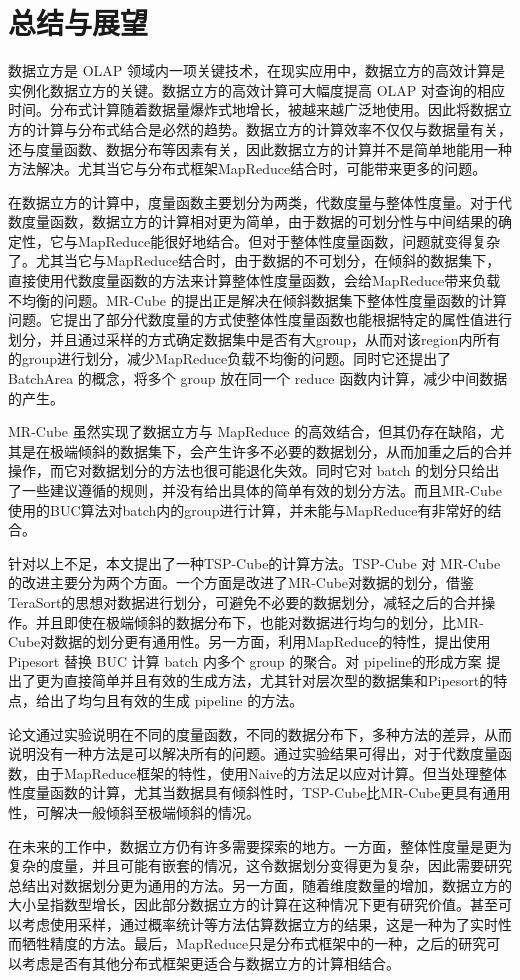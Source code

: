 
\chapter{总结与展望}

数据立方是 OLAP 领域内一项关键技术，在现实应用中，数据立方的高效计算是实例化数据立方的关键。数据立方的高效计算可大幅度提高 OLAP 对查询的相应时间。分布式计算随着数据量爆炸式地增长，被越来越广泛地使用。因此将数据立方的计算与分布式结合是必然的趋势。数据立方的计算效率不仅仅与数据量有关，还与度量函数、数据分布等因素有关，因此数据立方的计算并不是简单地能用一种方法解决。尤其当它与分布式框架MapReduce结合时，可能带来更多的问题。

在数据立方的计算中，度量函数主要划分为两类，代数度量与整体性度量。对于代数度量函数，数据立方的计算相对更为简单，由于数据的可划分性与中间结果的确定性，它与MapReduce能很好地结合。但对于整体性度量函数，问题就变得复杂了。尤其当它与MapReduce结合时，由于数据的不可划分，在倾斜的数据集下，直接使用代数度量函数的方法来计算整体性度量函数，会给MapReduce带来负载不均衡的问题。MR-Cube 的提出正是解决在倾斜数据集下整体性度量函数的计算问题。它提出了部分代数度量的方式使整体性度量函数也能根据特定的属性值进行划分，并且通过采样的方式确定数据集中是否有大group，从而对该region内所有的group进行划分，减少MapReduce负载不均衡的问题。同时它还提出了 BatchArea 的概念，将多个 group 放在同一个 reduce 函数内计算，减少中间数据的产生。

MR-Cube 虽然实现了数据立方与 MapReduce 的高效结合，但其仍存在缺陷，尤其是在极端倾斜的数据集下，会产生许多不必要的数据划分，从而加重之后的合并操作，而它对数据划分的方法也很可能退化失效。同时它对 batch 的划分只给出了一些建议遵循的规则，并没有给出具体的简单有效的划分方法。而且MR-Cube使用的BUC算法对batch内的group进行计算，并未能与MapReduce有非常好的结合。

针对以上不足，本文提出了一种TSP-Cube的计算方法。TSP-Cube 对 MR-Cube的改进主要分为两个方面。一个方面是改进了MR-Cube对数据的划分，借鉴TeraSort的思想对数据进行划分，可避免不必要的数据划分，减轻之后的合并操作。并且即使在极端倾斜的数据分布下，也能对数据进行均匀的划分，比MR-Cube对数据的划分更有通用性。另一方面，利用MapReduce的特性，提出使用 Pipesort 替换 BUC 计算 batch 内多个 group 的聚合。对 pipeline的形成方案 提出了更为直接简单并且有效的生成方法，尤其针对层次型的数据集和Pipesort的特点，给出了均匀且有效的生成 pipeline 的方法。

论文通过实验说明在不同的度量函数，不同的数据分布下，多种方法的差异，从而说明没有一种方法是可以解决所有的问题。通过实验结果可得出，对于代数度量函数，由于MapReduce框架的特性，使用Naive的方法足以应对计算。但当处理整体性度量函数的计算，尤其当数据具有倾斜性时，TSP-Cube比MR-Cube更具有通用性，可解决一般倾斜至极端倾斜的情况。

在未来的工作中，数据立方仍有许多需要探索的地方。一方面，整体性度量是更为复杂的度量，并且可能有嵌套的情况，这令数据划分变得更为复杂，因此需要研究总结出对数据划分更为通用的方法。另一方面，随着维度数量的增加，数据立方的大小呈指数型增长，因此部分数据立方的计算在这种情况下更有研究价值。甚至可以考虑使用采样，通过概率统计等方法估算数据立方的结果，这是一种为了实时性而牺牲精度的方法。最后，MapReduce只是分布式框架中的一种，之后的研究可以考虑是否有其他分布式框架更适合与数据立方的计算相结合。
